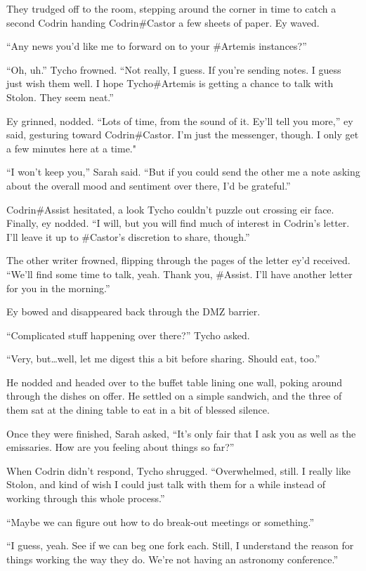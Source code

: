 They trudged off to the room, stepping around the corner in time to catch a second Codrin handing Codrin\#Castor a few sheets of paper. Ey waved.

``Any news you'd like me to forward on to your \#Artemis instances?''

``Oh, uh.'' Tycho frowned. ``Not really, I guess. If you're sending notes. I guess just wish them well. I hope Tycho\#Artemis is getting a chance to talk with Stolon. They seem neat.''

Ey grinned, nodded. ``Lots of time, from the sound of it. Ey'll tell you more,'' ey said, gesturing toward Codrin\#Castor. I'm just the messenger, though. I only get a few minutes here at a time."

``I won't keep you,'' Sarah said. ``But if you could send the other me a note asking about the overall mood and sentiment over there, I'd be grateful.''

Codrin\#Assist hesitated, a look Tycho couldn't puzzle out crossing eir face. Finally, ey nodded. ``I will, but you will find much of interest in Codrin's letter. I'll leave it up to \#Castor's discretion to share, though.''

The other writer frowned, flipping through the pages of the letter ey'd received. ``We'll find some time to talk, yeah. Thank you, \#Assist. I'll have another letter for you in the morning.''

Ey bowed and disappeared back through the DMZ barrier.

``Complicated stuff happening over there?'' Tycho asked.

``Very, but\ldots well, let me digest this a bit before sharing. Should eat, too.''

He nodded and headed over to the buffet table lining one wall, poking around through the dishes on offer. He settled on a simple sandwich, and the three of them sat at the dining table to eat in a bit of blessed silence.

Once they were finished, Sarah asked, ``It's only fair that I ask you as well as the emissaries. How are you feeling about things so far?''

When Codrin didn't respond, Tycho shrugged. ``Overwhelmed, still. I really like Stolon, and kind of wish I could just talk with them for a while instead of working through this whole process.''

``Maybe we can figure out how to do break-out meetings or something.''

``I guess, yeah. See if we can beg one fork each. Still, I understand the reason for things working the way they do. We're not having an astronomy conference.''

